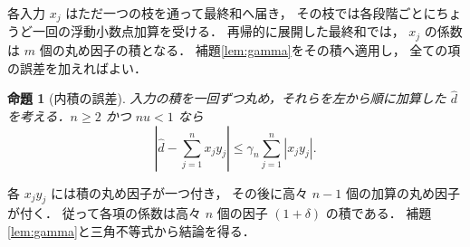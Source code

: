 \documentclass[a5paper,10pt,onecolumn]{jsarticle}
\makeatletter
\theoremstyle{mathnotetheorem}
\newtheorem{proposition}[theorem]{命題}
\renewcommand{\proofname}{証明}
\renewenvironment{proof}[1][\proofname]{%
  \par\pushQED{\qed}\normalfont\topsep4\p@\@plus2\p@\relax
  \trivlist\item[\hskip\labelsep\bfseries #1]\ignorespaces
}{\popQED\endtrivlist\@endpefalse}
\makeatother
\begin{document}
\begin{proof}
各入力 $x_j$ はただ一つの枝を通って最終和へ届き，
その枝では各段階ごとにちょうど一回の浮動小数点加算を受ける．
再帰的に展開した最終和では，
$x_j$ の係数は $m$ 個の丸め因子の積となる．
補題\ref{lem:gamma}をその積へ適用し，
全ての項の誤差を加えればよい．
\end{proof}
\begin{proposition}[内積の誤差]
入力の積を一回ずつ丸め，それらを左から順に加算した
$\widehat d$ を考える．$n\ge2$ かつ $nu<1$ なら
\[
 \left|\widehat d-\sum_{j=1}^n x_jy_j\right|
 \le\gamma_n\sum_{j=1}^n|x_jy_j|.
\]
\end{proposition}
\begin{proof}
各 $x_jy_j$ には積の丸め因子が一つ付き，
その後に高々 $n-1$ 個の加算の丸め因子が付く．
従って各項の係数は高々 $n$ 個の因子
$(1+\delta)$ の積である．
補題\ref{lem:gamma}と三角不等式から結論を得る．
\end{proof}
\end{document}
